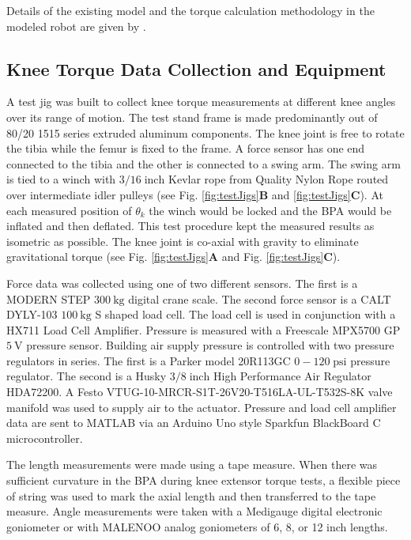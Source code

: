 Details of the existing model and the torque calculation methodology in the modeled robot are given by \citet{bolen_determination_2019, morrow_optimization_2020}.

\subsection{Knee Torque Data Collection and Equipment}\label{sec:torque_equipment}


A test jig was built to collect knee torque measurements at different knee angles over its range of motion. The test stand frame is made predominantly out of 80/20 1515 series extruded aluminum components. The knee joint is free to rotate the tibia while the femur is fixed to the frame. A force sensor has one end connected to the tibia and the other is connected to a swing arm. The swing arm is tied to a winch with $3/16\; \text{inch}$ Kevlar rope from Quality Nylon Rope routed over intermediate idler pulleys (see Fig. \ref{fig:testJigs}\textbf{B} and \ref{fig:testJigs}\textbf{C}). At each measured position of $\theta_{k}$ the winch would be locked and the BPA would be inflated and then deflated. This test procedure kept the measured results as isometric as possible.  The knee joint is co-axial with gravity to eliminate gravitational torque (see Fig. \ref{fig:testJigs}\textbf{A} and Fig. \ref{fig:testJigs}\textbf{C}).

Force data was collected using one of two different sensors. The first is a MODERN STEP $\qty{300}{\kilo\gram}$ digital crane scale. The second force sensor is a CALT DYLY-103 $\qty{100}{\kilo\gram}$ S shaped load cell. The load cell is used in conjunction with a HX711 Load Cell Amplifier. Pressure is measured with a Freescale MPX5700 GP $\qty{5}{\volt}$ pressure sensor. Building air supply pressure is controlled with two pressure regulators in series. The first is a Parker model 20R113GC $0-120\; \text{psi}$ pressure regulator. The second is a Husky $3/8 \; \text{inch}$ High Performance Air Regulator HDA72200. A Festo VTUG-10-MRCR-S1T-26V20-T516LA-UL-T532S-8K valve manifold was used to supply air to the actuator. Pressure and load cell amplifier data are sent to MATLAB via an Arduino Uno style Sparkfun BlackBoard C microcontroller. 


The length measurements were made using a tape measure. When there was sufficient curvature in the BPA during knee extensor torque tests, a flexible piece of string was used to mark the axial length and then transferred to the tape measure. Angle measurements were taken with a Medigauge digital electronic goniometer or with MALENOO analog goniometers of 6, 8, or 12 inch lengths.  

